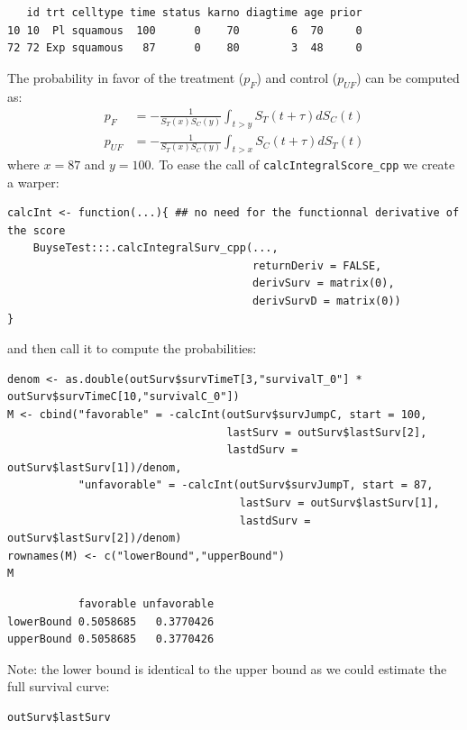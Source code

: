 \documentclass[12pt]{article}
\begin{document}
\begin{verbatim}
   id trt celltype time status karno diagtime age prior
10 10  Pl squamous  100      0    70        6  70     0
72 72 Exp squamous   87      0    80        3  48     0
\end{verbatim}


The probability in favor of the treatment (\(p_F\)) and control (\(p_{UF}\)) can be computed
as:
\begin{align*}
p_F &= -\frac{1}{S_T(x)S_C(y)}\int_{t>y} S_T(t+\tau) dS_C(t) \\
p_{UF} &= -\frac{1}{S_T(x)S_C(y)}\int_{t>x} S_C(t+\tau) dS_T(t)
\end{align*}
where \(x=87\) and \(y=100\). To ease the call of \texttt{calcIntegralScore\_cpp} we create a warper:
\lstset{language=r,label= ,caption= ,captionpos=b,numbers=none}
\begin{lstlisting}
calcInt <- function(...){ ## no need for the functionnal derivative of the score 
    BuyseTest:::.calcIntegralSurv_cpp(..., 
                                      returnDeriv = FALSE, 
                                      derivSurv = matrix(0), 
                                      derivSurvD = matrix(0))
}
\end{lstlisting}

and then call it to compute the probabilities:
\lstset{language=r,label= ,caption= ,captionpos=b,numbers=none}
\begin{lstlisting}
denom <- as.double(outSurv$survTimeT[3,"survivalT_0"] * outSurv$survTimeC[10,"survivalC_0"])
M <- cbind("favorable" = -calcInt(outSurv$survJumpC, start = 100, 
                                  lastSurv = outSurv$lastSurv[2],
                                  lastdSurv = outSurv$lastSurv[1])/denom,
           "unfavorable" = -calcInt(outSurv$survJumpT, start = 87, 
                                    lastSurv = outSurv$lastSurv[1],
                                    lastdSurv = outSurv$lastSurv[2])/denom)
rownames(M) <- c("lowerBound","upperBound")
M
\end{lstlisting}

\begin{verbatim}
           favorable unfavorable
lowerBound 0.5058685   0.3770426
upperBound 0.5058685   0.3770426
\end{verbatim}


Note: the lower bound is identical to the upper bound as we could
estimate the full survival curve:
\lstset{language=r,label= ,caption= ,captionpos=b,numbers=none}
\begin{lstlisting}
outSurv$lastSurv
\end{lstlisting}
\end{document}
